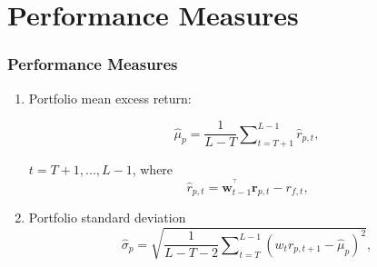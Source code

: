 \documentclass[pdf,10pt,xcolor=dvipsnames,hide notes]{beamer}
\begin{document}
\section{Performance Measures}

\begin{frame}
\frametitle{Performance Measures}

%
%
%
%

	\begin{enumerate}
	\setcounter{enumi}{0}

\item Portfolio mean excess return:

\begin{equation}
\widehat{\mu }_{p}=\frac{1}{L-T}\sum\nolimits_{t=T+1}^{L-1}\widehat{r}_{p,t},
\end{equation}

$t=T+1,...,L-1$, where 
\begin{equation}
\widehat{r}_{p,t}=\mathbf{w}_{t-1}^{^{\top }}\mathbf{r}_{p,t}-r_{f,t}\text{,}
\end{equation}%

\vspace{0.3cm}

\item Portfolio standard deviation 
\begin{equation}
\widehat{\sigma }_{p}=\sqrt{\frac{1}{L-T-2}\sum\nolimits_{t=T}^{L-1}\left(
	w_{t}r_{p,t+1}-\widehat{\mu }_{p}\right) ^{2}},
\end{equation}%

\end{enumerate}

\end{frame}
\end{document}

